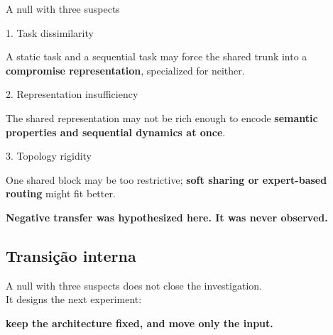 \documentclass{beamer}
\begin{document}
\begin{frame}{A null with three suspects}

    \begin{block}{1. Task dissimilarity}
        {\footnotesize A static task and a sequential task may force the shared trunk into a \textbf{compromise representation}, specialized for neither.\par}
    \end{block}
    \begin{block}{2. Representation insufficiency}
        {\footnotesize The shared representation may not be rich enough to encode \textbf{semantic properties and sequential dynamics at once}.\par}
    \end{block}
    \begin{block}{3. Topology rigidity}
        {\footnotesize One shared block may be too restrictive; \textbf{soft sharing or expert-based routing} might fit better.\par}
    \end{block}

    \vfill
    {\centering\textbf{Negative transfer was hypothesized here. It was never observed.}\par}
\end{frame}

\subsection{Transição interna}

{
\specialframe
\begin{frame}
    \vfill
    \begin{center}
        {\large A null with three suspects does not close the investigation.\\[1mm]
        It designs the next experiment:}

        \bigskip
        {\Large\bfseries keep the architecture fixed, and move only the input.}
    \end{center}
    \vfill
\end{frame}
}
\end{document}
